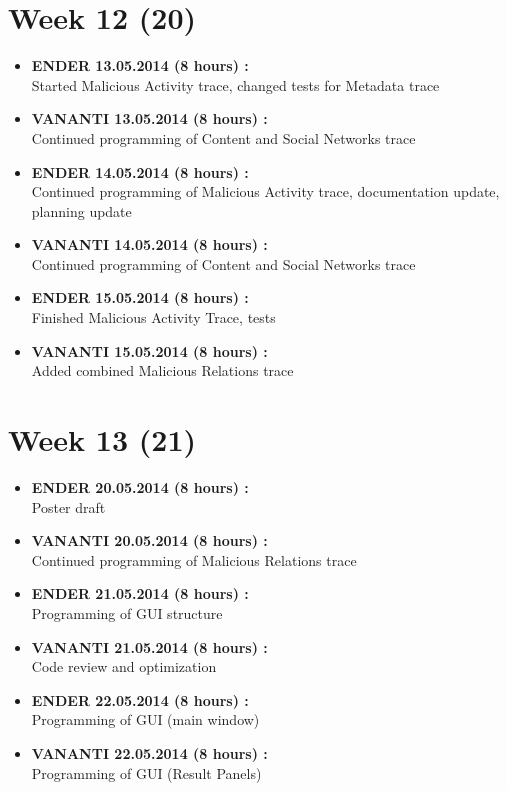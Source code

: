 \documentclass[
	a4paper,					10pt,							twoside,					openright,				notitlepage,			parskip=half,			]{scrreprt}
\begin{document}
\section*{Week 12 (20)}
\label{sec:worklog_12}
\begin{itemize}
\item{\textbf{ENDER 13.05.2014 (8 hours) :} \\  Started Malicious Activity trace, changed tests for Metadata trace }
\item{\textbf{VANANTI 13.05.2014 (8 hours) :} \\  Continued programming of Content and Social Networks trace}
\item{\textbf{ENDER 14.05.2014 (8 hours) :} \\  Continued programming of Malicious Activity trace, documentation update, planning update}
\item{\textbf{VANANTI 14.05.2014 (8 hours) :} \\  Continued programming of Content and Social Networks trace}
\item{\textbf{ENDER 15.05.2014 (8 hours) :} \\  Finished Malicious Activity Trace, tests}
\item{\textbf{VANANTI 15.05.2014 (8 hours) :} \\  Added combined Malicious Relations trace}
\end{itemize}
\section*{Week 13 (21)}
\label{sec:worklog_13}
\begin{itemize}
\item{\textbf{ENDER 20.05.2014 (8 hours) :} \\  Poster draft}
\item{\textbf{VANANTI 20.05.2014 (8 hours) :} \\  Continued programming of Malicious Relations trace}
\item{\textbf{ENDER 21.05.2014 (8 hours) :} \\  Programming of GUI structure}
\item{\textbf{VANANTI 21.05.2014 (8 hours) :} \\  Code review and optimization}
\item{\textbf{ENDER 22.05.2014 (8 hours) :} \\  Programming of GUI (main window)}
\item{\textbf{VANANTI 22.05.2014 (8 hours) :} \\  Programming of GUI (Result Panels)}
\end{itemize}
\end{document}

